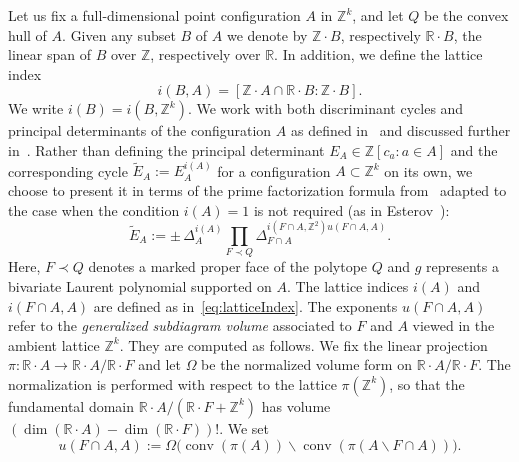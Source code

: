 \documentclass[11pt]{amsart}
\numberwithin{equation}{section}
\theoremstyle{plain}
\theoremstyle{definition}
\theoremstyle{remark}
\begin{document}
Let us fix a full-dimensional point configuration $A$ in ${\mathbb{Z}}^k$, and
let $Q$ be the convex hull of $A$. Given any subset $B$ of $A$ we
denote by ${\mathbb{Z}}{\!\cdot\!} B$, respectively ${\mathbb{R}}{\!\cdot\!} B$, the
linear span of $B$ over ${\mathbb{Z}}$, respectively over ${\mathbb{R}}$. In addition,
we define the lattice index
\begin{equation}
i(B,A)=[ {\mathbb{Z}}{\!\cdot\!} A\cap {\mathbb{R}}{\!\cdot\!} B:{\mathbb{Z}}{\!\cdot\!} B].\label{eq:latticeIndex}
\end{equation}
We write $i(B)=i(B,{\mathbb{Z}}^k)$.  We work with both 
discriminant cycles and principal determinants of the configuration $A$ as defined
in~\cite[Chapter 10]{GKZ} and discussed further in~\cite{CCDDRS11}. Rather than defining the principal
determinant $E_A\in {\mathbb{Z}}[c_a: a\in A]$ and the corresponding cycle
$\tilde{E}_A:=E_A^{i(A)}$ for a  configuration $A\subset {\mathbb{Z}}^k$ on its own,
we choose to present it in terms of the prime factorization formula
from~\cite[Theorem 1.2, $\S$~10.1.B]{GKZ} adapted to the case when the
condition $i(A)=1$ is not required (as in Esterov~\cite[Proposition 3.10]{Est10}): 
\begin{equation}\label{eq:ProdFormulaGKZ}
  \tilde{E}_A:=   \pm\, \Delta_A^{i(A)}\prod_{F\prec Q} {\Delta}_{F\cap A}^{i(F\cap A,{\mathbb{Z}}^2)u(F\cap A,A)}.
\end{equation}
Here, $F\prec Q$ denotes a marked proper face of the polytope $Q$ and
$g$ represents a bivariate Laurent polynomial supported on $A$. The
lattice indices $i(A)$ and $i(F\cap A,A)$ are defined as
in~\eqref{eq:latticeIndex}. The exponents $u(F\cap A,A)$ refer to the
\emph{generalized subdiagram volume} associated to $F$ and $A$ viewed
in the ambient lattice ${\mathbb{Z}}^k$. They are computed as follows. We fix
the linear projection $\pi\colon {\mathbb{R}}{\!\cdot\!} A\to {\mathbb{R}}{\!\cdot\!}
A/{\mathbb{R}}{\!\cdot\!} F$ and let $\Omega$ be the normalized volume form on
${\mathbb{R}}{\!\cdot\!} A/{\mathbb{R}}{\!\cdot\!} F$. The normalization is performed with
respect to the lattice $\pi({\mathbb{Z}}^k)$, so that the fundamental domain $
{\mathbb{R}}{\!\cdot\!} A/({\mathbb{R}}{\!\cdot\!} F +{\mathbb{Z}}^k)$ has volume
$(\dim({\mathbb{R}}{\!\cdot\!} A)-\dim({\mathbb{R}}{\!\cdot\!} F))!$. We set
\begin{equation}
  \label{eq:subdiagramVol}
  u(F\cap A,A):=\Omega\big(\operatorname{\operatorname{conv}}(\pi(A))\smallsetminus \operatorname{\operatorname{conv}}(\pi(A\smallsetminus F\cap A))\big).
\end{equation}
\end{document}
